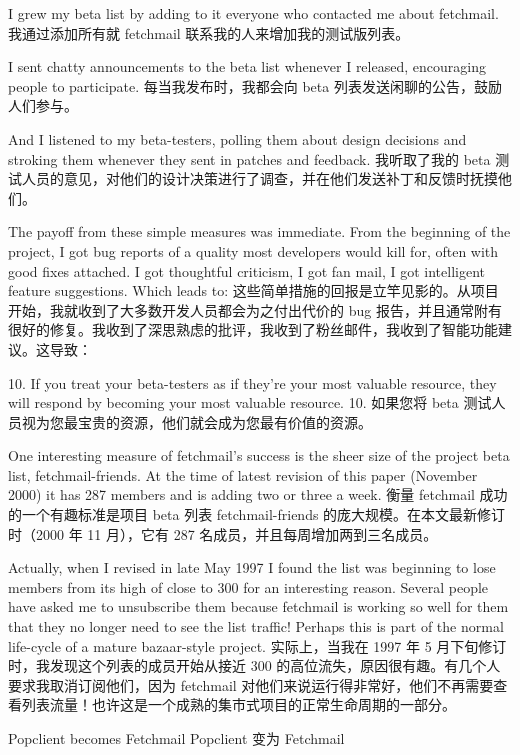 \documentclass[a4paper,12pt,UTF8,twoside]{ctexbook}
\begin{document}
I grew my beta list by adding to it everyone who contacted me about fetchmail.
我通过添加所有就 fetchmail 联系我的人来增加我的测试版列表。

I sent chatty announcements to the beta list whenever I released, encouraging people to participate.
每当我发布时，我都会向 beta 列表发送闲聊的公告，鼓励人们参与。

And I listened to my beta-testers, polling them about design decisions and stroking them whenever they sent in patches and feedback.
我听取了我的 beta 测试人员的意见，对他们的设计决策进行了调查，并在他们发送补丁和反馈时抚摸他们。

The payoff from these simple measures was immediate. From the beginning of the project, I got bug reports of a quality most developers would kill for, often with good fixes attached. I got thoughtful criticism, I got fan mail, I got intelligent feature suggestions. Which leads to:
这些简单措施的回报是立竿见影的。从项目开始，我就收到了大多数开发人员都会为之付出代价的 bug 报告，并且通常附有很好的修复。我收到了深思熟虑的批评，我收到了粉丝邮件，我收到了智能功能建议。这导致：

10. If you treat your beta-testers as if they're your most valuable resource, they will respond by becoming your most valuable resource.
10. 如果您将 beta 测试人员视为您最宝贵的资源，他们就会成为您最有价值的资源。

One interesting measure of fetchmail's success is the sheer size of the project beta list, fetchmail-friends. At the time of latest revision of this paper (November 2000) it has 287 members and is adding two or three a week.
衡量 fetchmail 成功的一个有趣标准是项目 beta 列表 fetchmail-friends 的庞大规模。在本文最新修订时（2000 年 11 月），它有 287 名成员，并且每周增加两到三名成员。

Actually, when I revised in late May 1997 I found the list was beginning to lose members from its high of close to 300 for an interesting reason. Several people have asked me to unsubscribe them because fetchmail is working so well for them that they no longer need to see the list traffic! Perhaps this is part of the normal life-cycle of a mature bazaar-style project.
实际上，当我在 1997 年 5 月下旬修订时，我发现这个列表的成员开始从接近 300 的高位流失，原因很有趣。有几个人要求我取消订阅他们，因为 fetchmail 对他们来说运行得非常好，他们不再需要查看列表流量！也许这是一个成熟的集市式项目的正常生命周期的一部分。

Popclient becomes Fetchmail
Popclient 变为 Fetchmail
\end{document}
